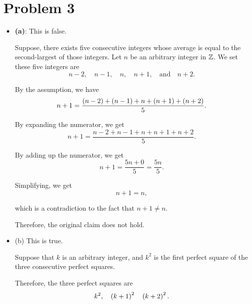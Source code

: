 \section{Problem 3}
\begin{itemize}
    \item \textbf{(a)}:
    This is false. 
    \begin{solution}
        Suppose, there exists five consecutive integers whose average is equal to the second-largest of those integers. 
        Let $n$ be an arbitrary integer in $\mathbb{Z}$. 
        We set these five integers are 
        \begin{equation*}
            n - 2, \quad n - 1, \quad n, \quad n + 1, \quad\text{and} \quad n + 2. 
        \end{equation*}

        By the assumption, we have 
        \begin{equation*}
            n + 1 = \frac{\left(n - 2\right) + \left(n - 1\right) + n + \left(n + 1\right) + \left(n + 2\right)}{5}. 
        \end{equation*}

        By expanding the numerator, we get 
        \begin{equation*}
            n + 1 = \frac{n - 2 + n - 1 + n + n + 1 + n + 2}{5}. 
        \end{equation*}

        By adding up the numerator, we get 
        \begin{equation*}
            n + 1 = \frac{5n + 0}{5} = \frac{5n}{5}. 
        \end{equation*}

        Simplifying, we get 
        \begin{equation*}
            n + 1 = n, 
        \end{equation*}

        which is a contradiction to the fact that $n + 1 \neq n$. 

        Therefore, the original claim does not hold. 
    \end{solution}

    \newpage

    \item (b) This is true. 
    \begin{solution}
        Suppose that $k$ is an arbitrary integer, and $k^2$ is the first perfect square of the three consecutive perfect squares. 

        Therefore, the three perfect squares are 
        \begin{equation*}
            k^2, \quad \left(k + 1\right)^2 \quad \left(k + 2\right)^2.  
        \end{equation*}


\end{solution}
\end{itemize}
